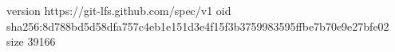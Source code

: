 version https://git-lfs.github.com/spec/v1
oid sha256:8d788bd5d58dfa757c4eb1e151d3e4f15f3b3759983595ffbe7b70e9e27bfe02
size 39166
